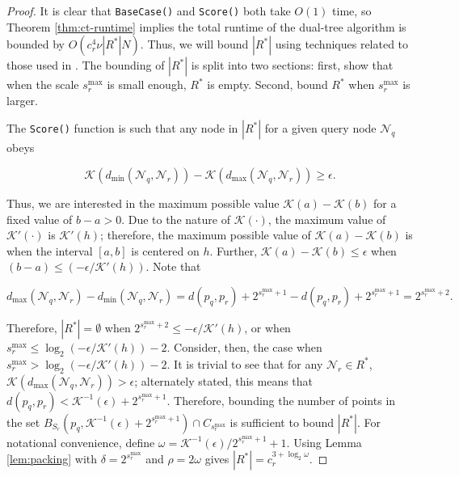 \begin{proof}
It is clear that \texttt{BaseCase()} and \texttt{Score()} both take $O(1)$ time,
so Theorem \ref{thm:ct-runtime} implies the total runtime of the dual-tree
algorithm is bounded by $O(c_r^4 \nu |R^*| N)$.  Thus, we will bound $|R^*|$
using techniques related to those used in \cite{ram2009}.  The bounding of
$|R^*|$ is split into two sections: first, show that when the scale $s_r^{\max}$
is small enough, $R^*$ is empty.  Second, bound $R^*$ when $s_r^{\max}$ is larger.

The \texttt{Score()} function is such that any node in $|R^*|$ for a given query
node $\mathscr{N}_q$ obeys

\begin{equation}
\mathcal{K}(d_{\min}(\mathscr{N}_q, \mathscr{N}_r)) -
\mathcal{K}(d_{\max}(\mathscr{N}_q, \mathscr{N}_r))
\ge \epsilon.
\end{equation}

Thus, we are interested in the maximum possible value $\mathcal{K}(a) -
\mathcal{K}(b)$ for a fixed value of $b - a > 0$.  Due to the nature of
$\mathcal{K}(\cdot)$, the maximum value of $\mathcal{K}'(\cdot)$ is
$\mathcal{K}'(h)$; therefore, the maximum possible value of $\mathcal{K}(a) -
\mathcal{K}(b)$ is when the interval $[a, b]$ is centered on $h$.  Further,
$\mathcal{K}(a) - \mathcal{K}(b) \le \epsilon$ when $(b - a) \le (-\epsilon /
\mathcal{K}'(h))$.  Note that

\begin{equation}
d_{\max}(\mathscr{N}_q, \mathscr{N}_r) - d_{\min}(\mathscr{N}_q, \mathscr{N}_r)
= d(p_q, p_r) + 2^{s_r^{\max} + 1} - d(p_q, p_r) + 2^{s_r^{\max} + 1} = 2^{s_r^{\max} + 2}.
\end{equation}

Therefore, $|R^*| = \emptyset$ when
$2^{s_r^{\max} + 2} \le -\epsilon / \mathcal{K}'(h)$, or when
$s_r^{\max} \le \log_2( -\epsilon / \mathcal{K}'(h) ) - 2$.
%
Consider, then, the case when $s_r^{\max} > \log_2( -\epsilon /
\mathcal{K}'(h) ) - 2$.  It is trivial to see that for any $\mathscr{N}_r \in
R^*$, $\mathcal{K}(d_{\max}(\mathscr{N}_q, \mathscr{N}_r)) > \epsilon$;
alternately stated, this means that
$d(p_q, p_r) < \mathcal{K}^{-1}(\epsilon) + 2^{s_r^{\max} + 1}$.
Therefore, bounding the number of points in the set
$B_{S_r}(p_q, \mathcal{K}^{-1}(\epsilon) + 2^{s_r^{\max} + 1}) \cap
C_{s_r^{\max}}$
is sufficient to bound $|R^*|$.  For notational convenience, define $\omega = \mathcal{K}^{-1}(\epsilon) /
2^{s_r^{\max} + 1} + 1$.  Using Lemma \ref{lem:packing} with $\delta =
2^{s_r^{\max}}$ and $\rho = 2 \omega$ gives $|R^*| = c_r^{3 + \log_2 \omega}$.


\end{proof}
